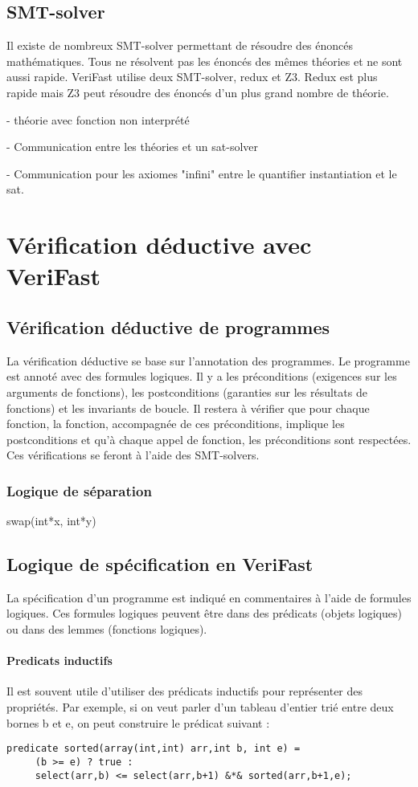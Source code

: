 \documentclass[9pt]{book}
\newcommand{\verifast}{VeriFast}
\begin{document}
 	\section{SMT-solver}
 		Il existe de nombreux SMT-solver permettant de r\'esoudre des \'enonc\'es math\'ematiques. Tous ne r\'esolvent pas les \'enonc\'es des m\^emes th\'eories et ne sont aussi rapide. \verifast{} utilise deux SMT-solver, redux et Z3. Redux est plus rapide mais Z3 peut r\'esoudre des \'enonc\'es d'un plus grand nombre de th\'eorie.

 		- th\'eorie avec fonction non interpr\'et\'e \par
 		- Communication entre les th\'eories et un sat-solver \par
 		- Communication pour les axiomes "infini" entre le quantifier instantiation et le sat.

\chapter{V\'erification d\'eductive avec \verifast{}}
	\section{V\'erification d\'eductive de programmes}
		La v\'erification d\'eductive se base sur l'annotation des programmes. Le programme est annot\'e avec des formules logiques. Il y a les pr\'econditions (exigences sur les arguments de fonctions), les postconditions (garanties sur les r\'esultats de fonctions) et les invariants de boucle. Il restera \`a v\'erifier que pour chaque fonction, la fonction, accompagn\'ee de ces pr\'econditions, implique les postconditions et qu'\`a chaque appel de fonction, les pr\'econditions sont respect\'ees. Ces v\'erifications se feront \`a l'aide des SMT-solvers.
		\subsection{Logique de s\'eparation}
			swap(int*x, int*y)
	\section{Logique de sp\'ecification en \verifast{}}
		La sp\'ecification d'un programme est indiqu\'e en commentaires \`a l'aide de formules logiques. Ces formules logiques peuvent \^etre dans des pr\'edicats (objets logiques) ou dans des lemmes (fonctions logiques).
		\subsubsection{Predicats inductifs}
			Il est souvent utile d'utiliser des pr\'edicats inductifs pour repr\'esenter des propri\'et\'es. Par exemple, si on veut parler d'un tableau d'entier tri\'e entre deux bornes b et e, on peut construire le pr\'edicat suivant :
			\begin{lstlisting}
predicate sorted(array(int,int) arr,int b, int e) =
     (b >= e) ? true :
     select(arr,b) <= select(arr,b+1) &*& sorted(arr,b+1,e);
			\end{lstlisting}
\end{document}
